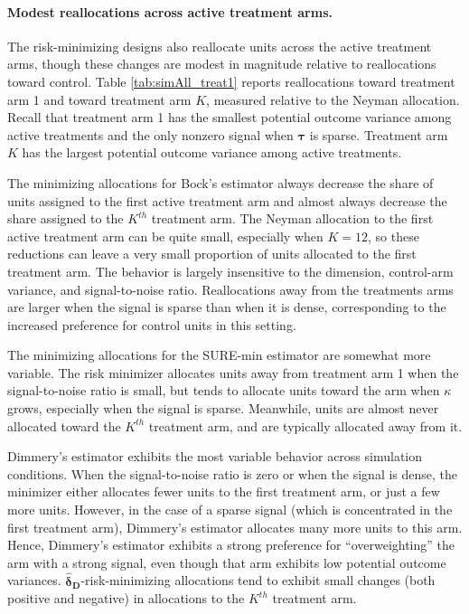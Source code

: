 \documentclass{article}
\newcommand{\bstau}{\boldsymbol \tau}
\newcommand{\bsdeltad}{\boldsymbol{\hat \delta_{\textbf{D}}}}
\newcommand{\bsdeltb}{\boldsymbol {\hat \delta_B}}
\newcommand{\bsdelts}{\boldsymbol {\hat \delta_S}}
\begin{document}


\paragraph{Modest reallocations across active treatment arms.}
The risk-minimizing designs also reallocate units across the active treatment arms, though these changes are modest in magnitude relative to reallocations toward control. Table \ref{tab:simAll_treat1} reports reallocations toward treatment arm 1 and toward treatment arm $K$, measured relative to the Neyman allocation. Recall that treatment arm 1 has the smallest potential outcome variance among active treatments and the only nonzero signal when $\bstau$ is sparse. Treatment arm $K$ has the largest potential outcome variance among active treatments. 

The minimizing allocations for Bock's estimator always decrease the share of units assigned to the first active treatment arm and almost always decrease the share assigned to the $K^{th}$ treatment arm. The Neyman allocation to the first active treatment arm can be quite small, especially when $K = 12$, so these reductions can leave a very small proportion of units allocated to the first treatment arm. The behavior is largely insensitive to the dimension, control-arm variance, and signal-to-noise ratio. Reallocations away from the treatments arms are larger when the signal is sparse than when it is dense, corresponding to the increased preference for control units in this setting. 

The minimizing allocations for the SURE-min estimator are somewhat more variable. The risk minimizer allocates units away from treatment arm 1 when the signal-to-noise ratio is small, but tends to allocate units toward the arm when $\kappa$ grows, especially when the signal is sparse. Meanwhile, units are almost never allocated toward the $K^{th}$ treatment arm, and are typically allocated away from it. 

Dimmery's estimator exhibits the most variable behavior across simulation conditions. When the signal-to-noise ratio is zero or when the signal is dense, the minimizer either allocates fewer units to the first treatment arm, or just a few more units. However, in the case of a sparse signal (which is concentrated in the first treatment arm), Dimmery's estimator allocates many more units to this arm. Hence, Dimmery's estimator exhibits a strong preference for ``overweighting'' the arm with a strong signal, even though that arm exhibits low potential outcome variances. $\bsdeltad$-risk-minimizing allocations tend to exhibit small changes (both positive and negative) in allocations to the $K^{th}$ treatment arm.
\end{document}
